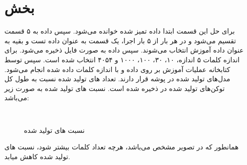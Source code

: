 \documentclass[a4paper]{article}
\begin{document}
\section{بخش }
برای حل این قسمت ابتدا داده تمیز شده خوانده می‌شود. سپس داده به ۵ قسمت تقسیم می‌شود و در هر بار از ۵ بار اجرا، یک قسمت به عنوان داده تست و بقیه به عنوان داده آموزش انتخاب می‌شوند. سپس داده به صورت فایل  ذخیره می‌شود. برای اندازه کلمات ۵ اندازه، ۱۰، ۳۰، ۱۰۰، ۱۰۰۰ و ۴۰۵۴ انتخاب شده است. سپس توسط کتابخانه  عملیات آموزش بر روی داده و با اندازه کلمات داده شده انجام می‌شود. مدل‌‌های تولید شده در پوشه قرار دارند. تعداد  های تولید شده نسبت به طول کل توکن‌های تولید شده در   ذخیره شده است. نسبت  های تولید شده به صورت زیر می‌باشد:
\newline
‎\graphicspath{{../reports}}‎

\begin{figure}[h!]
\caption{نسبت  های تولید شده}
\label{f1}
\end{figure}
\vspace{10mm}

همانطور که در تصویر مشخص می‌باشد، هرچه تعداد کلمات بیشتر شود، نسبت های تولید شده کاهش میابد.
\end{document}
